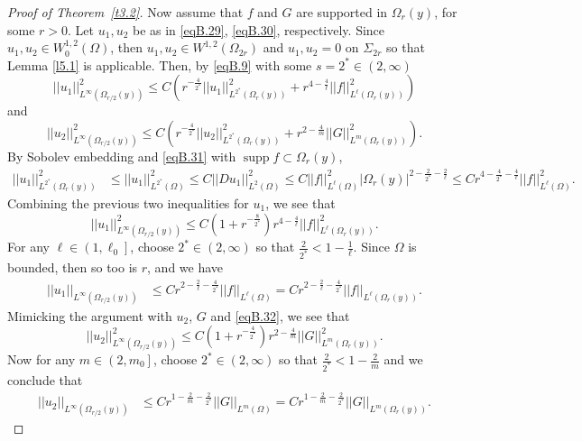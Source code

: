 \documentclass[12pt,reqno]{amsart}
\theoremstyle{plain}
\theoremstyle{definition}
\newenvironment{pf}
{\begin{proof}} {\end{proof}}
\DeclareMathOperator{\supp}{supp}
\newcommand{\Om}{\Omega}
\newcommand{\Si}{\Sigma}
\newcommand{\iny}{\infty}
\newcommand{\norm}[1]{\left\vert \left\vert #1\right\vert\right\vert}
\newcommand{\abs}[1]{\left\vert#1\right\vert}
\newcommand{\pr}[1]{\left( #1 \right) }
\newcommand{\pb}[1]{\left( #1 \right] }
\begin{document}
\begin{appendix}
\begin{pf}[Proof of Theorem~\ref{t3.2}]
Now assume that $f$ and $G$ are supported in $\Om_r(y)$, for some $r > 0$.
Let $u_1, u_2$ be as in \eqref{eqB.29}, \eqref{eqB.30}, respectively.  
Since $u_1, u_2 \in W^{1,2}_0\pr{\Om}$, then $u_1, u_2 \in W^{1,2}\pr{\Om_{2r}}$ and $u_1, u_2 = 0$ on $\Si_{2r}$ so that Lemma \ref{l5.1} is applicable. 
Then, by \eqref{eqB.9} with some $s = 2^* \in \pr{2, \iny}$
$$\norm{u_1}^2_{L^\infty\pr{\Om_{r/2}\pr{y}}} 
\le C \pr{ r^{-\frac{4}{2^*}} \norm{u_1}^2_{L^{2^*}\pr{\Om_r\pr{y}}} + r^{4 - \frac{4}{\ell}} \norm{f}^2_{L^{\ell}\pr{\Om_r\pr{y}}}}$$
and
$$\norm{u_2}^2_{L^\infty\pr{\Om_{r/2}\pr{y}}} 
\le C \pr{ r^{-\frac{4}{2^*}} \norm{u_2}^2_{L^{2^*}\pr{\Om_r\pr{y}}} + r^{2 - \frac{4}{m}} \norm{G}^2_{L^{m}\pr{\Om_r\pr{y}}}}.$$
By Sobolev embedding and \eqref{eqB.31} with $\supp f \subset \Om_r\pr{y}$,
\begin{align*}
\norm{u_1}^2_{L^{2^*}\pr{\Om_r\pr{y}}} 
&\le \norm{u_1}^2_{L^{2^*}\pr{\Om}} 
\le C \norm{Du_1}^2_{L^2\pr{\Om}}
\le C \norm{f}^2_{L^{\ell}\pr{\Om}}\abs{ \Om_r\pr{y}}^{2 - \frac 2 {2^*} - \frac 2{\ell}} 
\le C r^{4 - \frac {4}{2^*} - \frac 4 \ell}  \norm{f}^2_{L^{\ell}\pr{\Om}} .
\end{align*}
Combining the previous two inequalities for $u_1$, we see that
$$\norm{u_1}^2_{L^\infty\pr{\Om_{r/2}\pr{y}}} 
\le C  \pr{1 + r^{-\frac{8}{2^*}}} r^{4 - \frac{4}{\ell}} \norm{f}^2_{L^{\ell}\pr{\Om_r\pr{y}}}.$$
For any $\ell \in \pb{1, \ell_0}$, choose $2^* \in \pr{2, \iny}$ so that $\frac 2 {2^*} < 1 - \frac 1 \ell$.
Since $\Om$ is bounded, then so too is $r$, and we have
\begin{align}
\norm{u_1}_{L^\infty \pr{\Om_{r/2}\pr{y}}} 
&\le C r^{2-\frac{2}{\ell} - \frac 4 {2^*}} \norm{f}_{L^{\ell}\pr{\Om}} 
= C r^{2-\frac{2}{\ell} - \frac 4 {2^*}} \norm{f}_{L^{\ell}\pr{\Om_r\pr{y}}}.
\label{eqB.36}
\end{align}
Mimicking the argument with $u_2$, $G$ and \eqref{eqB.32}, we see that
$$\norm{u_2}^2_{L^\infty\pr{\Om_{r/2}\pr{y}}} 
\le C  \pr{1 + r^{-\frac{4}{2^*}}} r^{2 - \frac{4}{m}} \norm{G}^2_{L^{m}\pr{\Om_r\pr{y}}}.$$
Now for any $m \in \pb{2, m_0}$, choose $2^* \in \pr{2, \iny}$ so that $\frac 2 {2^*} < 1 - \frac 2 m$ and we conclude that
\begin{align}
\norm{u_2}_{L^\infty \pr{\Om_{r/2}\pr{y}}} 
&\le C r^{1-\frac{2}{m} - \frac 2 {2^*}} \norm{G}_{L^{m}\pr{\Om}} 
= C r^{1-\frac{2}{m} - \frac 2 {2^*}} \norm{G}_{L^{m}\pr{\Om_r\pr{y}}}.
\label{eqB.37}
\end{align}


\end{pf}
\end{appendix}
\end{document}
